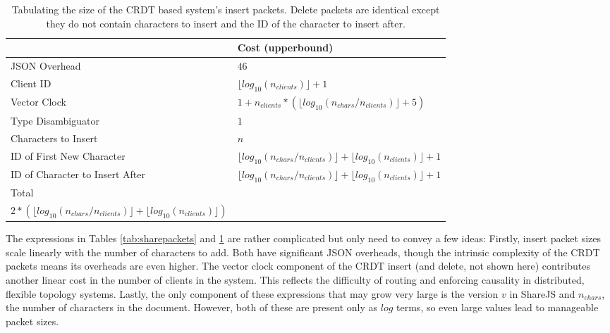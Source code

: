 \documentclass[12pt,a4paper,twoside,openright]{report}
\begin{document}
			\begin{table}[htb]
			\centering
			\caption[CRDT System Insert Packet Size]{Tabulating the size of the CRDT based system's insert packets. Delete packets are identical except they do not contain characters to insert and the ID of the character to insert after.}
			\label{tab:crdtinsertpacket}
			\setlength{\tabcolsep}{12pt}
			\begin{tabular}{@{}ll@{}}
			
                             & Cost (upperbound)\\ \toprule                                                                                                                                                       
			JSON Overhead                   & $46$ \\ \midrule
			Client ID                       & $\lfloor log_{10}(n_{clients}) \rfloor+1$  \\ \midrule
			Vector Clock                    & $1 + n_{clients} * (\lfloor log_{10}(n_{chars}/n_{clients})\rfloor + 5)$ \\ \midrule
			Type Disambiguator              & $1$ \\ \midrule
			Characters to Insert            & $n$ \\ \midrule
			ID of First New Character       & $\lfloor log_{10}(n_{chars}/n_{clients}) \rfloor + \lfloor log_{10}(n_{clients}) \rfloor  +1$  \\ \midrule
			ID of Character to Insert After & $\lfloor log_{10}(n_{chars}/n_{clients}) \rfloor + \lfloor log_{10}(n_{clients}) \rfloor +1$  \\ \bottomrule
			Total                           & \makecell{$51 + n + 5n_{clients} + n_{clients} *(\lfloor log_{10}(n_{chars}/n_{clients}\rfloor) +$ \\ $2*(\lfloor log_{10}(n_{chars}/n_{clients}) \rfloor + \lfloor log_{10}(n_{clients}) \rfloor)$}
			\end{tabular}
			\end{table}
			
			The expressions in Tables \ref{tab:sharepackets} and \ref{tab:crdtinsertpacket} are rather complicated but only need to convey a few ideas: Firstly, insert packet sizes scale linearly with the number of characters to add. Both have significant JSON overheads, though the intrinsic complexity of the CRDT packets means its overheads are even higher. The vector clock component of the CRDT insert (and delete, not shown here) contributes another linear cost in the number of clients in the system. This reflects the difficulty of routing and enforcing causality in distributed, flexible topology systems. Lastly, the only component of these expressions that may grow very large is the version $v$ in ShareJS and $n_{chars}$, the number of characters in the document. However, both of these are present only as $log$ terms, so even large values lead to manageable packet sizes.
			
\end{document}
